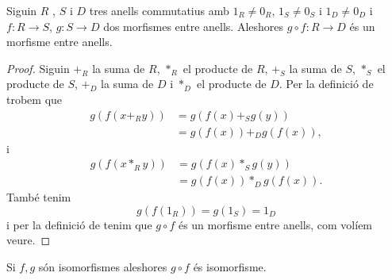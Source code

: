 \documentclass[../Apunts.tex]{subfiles}
\begin{document}
	\begin{proposition}
		\label{prop:operació morfismes entre anells és morfisme entre anells}
		Siguin \(R\) , \(S\) i \(D\) tres anells commutatius amb \(1_{R}\neq0_{R}\), \(1_{S}\neq0_{S}\) i \(1_{D}\neq0_{D}\) i \(f\colon R\longrightarrow S\), \(g\colon S\longrightarrow D\) dos morfismes entre anells.
		Aleshores \(g\circ f\colon R\longrightarrow D\) és un morfisme entre anells.
		\begin{proof}
			Siguin \(+_{R}\) la suma de \(R\), \(\ast_{R}\) el producte de \(R\), \(+_{S}\) la suma de \(S\), \(\ast_{S}\) el producte de \(S\), \(+_{D}\) la suma de \(D\) i \(\ast_{D}\) el producte de \(D\). Per la definició de  trobem que
			\begin{align*}
			g(f(x+_{R}y))&=g(f(x)+_{S}g(y))\\
			&=g(f(x))+_{D}g(f(x)),
			\end{align*}
			i
			\begin{align*}
			g(f(x\ast_{R}y))&=g(f(x)\ast_{S}g(y))\\
			&=g(f(x))\ast_{D}g(f(x)).
			\end{align*}
			També tenim
			\[g(f(1_{R}))=g(1_{S})=1_{D}\]
			i per la definició de  tenim que \(g\circ f\) és un morfisme entre anells, com volíem veure.
		\end{proof}
	\end{proposition}
	\begin{corollary}
		\label{corollary:conjugació isomorfismes enre anells és isomorfisme entre anells}
		Si \(f,g\) són isomorfismes aleshores \(g\circ f\) és isomorfisme.
	\end{corollary}
\end{document}

